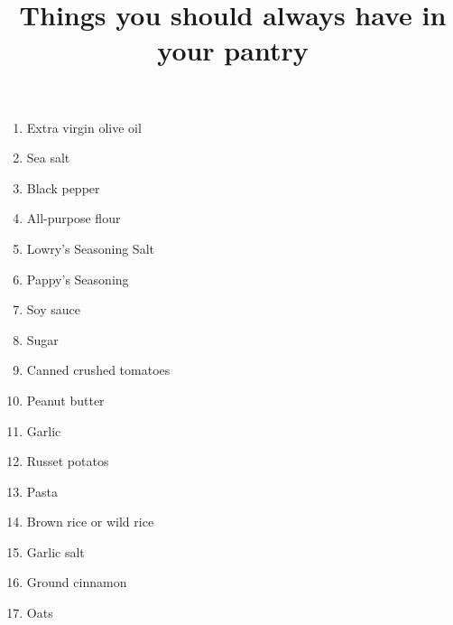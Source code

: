 \documentclass{article}
\title{Things you should always have in your pantry}
\begin{document}
\maketitle

\begin{enumerate}
\item{Extra virgin olive oil}
\item{Sea salt}
\item{Black pepper}
\item{All-purpose flour}
\item{Lowry's Seasoning Salt}
\item{Pappy's Seasoning}
\item{Soy sauce}
\item{Sugar}
\item{Canned crushed tomatoes}
\item{Peanut butter}
\item{Garlic}
\item{Russet potatos}
\item{Pasta}
\item{Brown rice or wild rice}
\item{Garlic salt}
\item{Ground cinnamon}
\item{Oats}
\end{enumerate}
\end{document}
